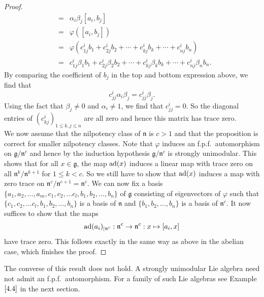 \documentclass[12pt]{amsart}
\theoremstyle{definition}
\theoremstyle{remark}
\newcommand{\ad}{{\rm ad}}
\newcommand{\Lg}{\mathfrak{g}}
\newcommand{\Ln}{\mathfrak{n}}
\begin{document}
\begin{proof}
\begin{eqnarray*}
                                                     & = &  \alpha_i \beta_j [a_i,b_j]  \\          
                                                     & = & \varphi( [a_i,b_j] ) \\                  
                                                     & = & \varphi (c^i_{1j} b_1 + c^i_{2j} b_2 +
 \cdots + c^i_{kj} b_k + \cdots + c^i_{nj} b_n)\\                                                 
                                                     & = & c^i_{1j} \beta_1 b_1 + c^i_{2j} \beta_2 b_2
                                                           + \cdots + c^i_{kj} \beta_k b_k + \cdots
                                                           + c^i_{nj} \beta_n b_n.                            
\end{eqnarray*}
By comparing the coefficient of $b_j$ in the top and bottom expression above, we find that
\[
c^i_{jj} \alpha_i \beta_j = c^i_{jj}  \beta_j.
\]
Using the fact that $\beta_j\neq 0$ and $\alpha_i \neq 1$, we find that $c^i_{jj}=0$. So the diagonal entries of
$\left( c^i_{kj} \right)_{1\leq k,j \le n}$ are all zero and hence this matrix has trace zero. \\[0.2cm]
We now assume that the nilpotency class of $\Ln$ is  $c>1$ and that the proposition is correct for 
smaller nilpotency classes. Note that $\varphi$ induces an f.p.f.\ automorphism on $\Lg/\Ln^c$ and hence by the
induction hypothesis $\Lg/\Ln^c$ is strongly unimodular. This shows that for all $x\in \Lg$, the map  $\ad(x)$ induces a
linear map with trace zero on all $\Ln^k/\Ln^{k+1}$ for $1 \leq k < c$. So we still have to show that $\ad(x)$ induces
a map with zero trace on $\Ln^c/\Ln^{c+1}= \Ln^c$. We can now fix a basis
$\{a_1,a_2, \ldots , a_m, c_1, c_2, \ldots c_l, b_1, b_2, \ldots, b_n\}$ of $\Lg$ consisting of eigenvectors of $\varphi$
such that $\{ c_1, c_2, \ldots c_l, b_1, b_2, \ldots, b_n\}$ is a basis of $\Ln$ and $\{ b_1, b_2, \ldots, b_n\}$
is a basis of $\Ln^c$. It now suffices to show that the maps
\[                                                                                                  
\ad(a_i)_{|\Ln^c}: \Ln^c \to \Ln^c: x \mapsto [a_i,x]                                               
\]
have trace zero. This follows exactly in the same way as above in the abelian case, which finishes
the proof.
\end{proof}  

The converse of this result does not hold. A strongly unimodular Lie algebra need not admit an
f.p.f.\ automorphism. For a family of such Lie algebras see Example $\ref{4.4}$ in the next section.
\end{document}
